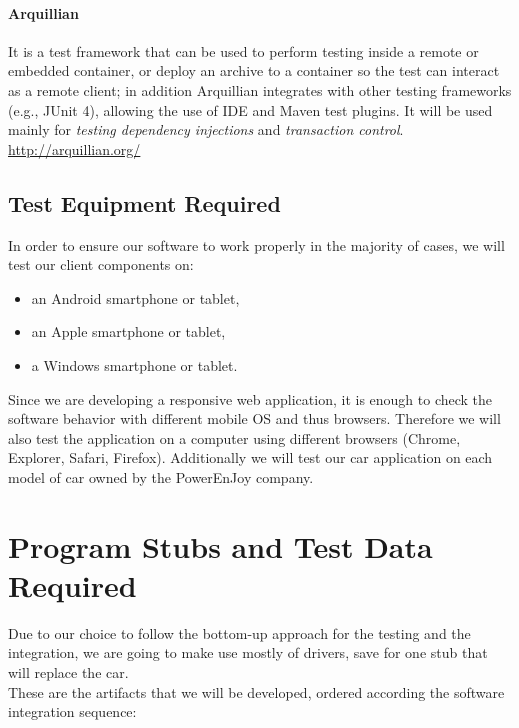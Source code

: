 \documentclass[english]{article}
\begin{document}
\paragraph{Arquillian}
It is a test framework that can be used to perform testing inside a remote or embedded container, or deploy an archive to a container so the test can interact as a remote client; in addition Arquillian integrates with other testing frameworks (e.g., JUnit 4), allowing the use of IDE and Maven test plugins.
It will be used mainly for \emph{testing dependency injections} and \emph{transaction control}.\\
\url{http://arquillian.org/}




\subsection{Test Equipment Required}
In order to ensure our software to work properly in the majority of cases, we will test our client components on:
\begin{itemize}
\item an Android smartphone or tablet,
\item an Apple smartphone or tablet,
\item a Windows smartphone or tablet.
\end{itemize}
Since we are developing a responsive web application, it is enough to check the software behavior with different mobile OS and thus browsers. Therefore we will also test the application on a computer using different browsers (Chrome, Explorer, Safari, Firefox).
Additionally we will test our car application on each model of car owned by the PowerEnJoy company.

\newpage
\section{Program Stubs and Test Data Required}


Due to our choice to follow the bottom-up approach for the testing and the integration, we are going to make use mostly of drivers, save for one stub that will replace the car.\\
These are the artifacts that we will be developed, ordered according the software integration sequence:
\end{document}
